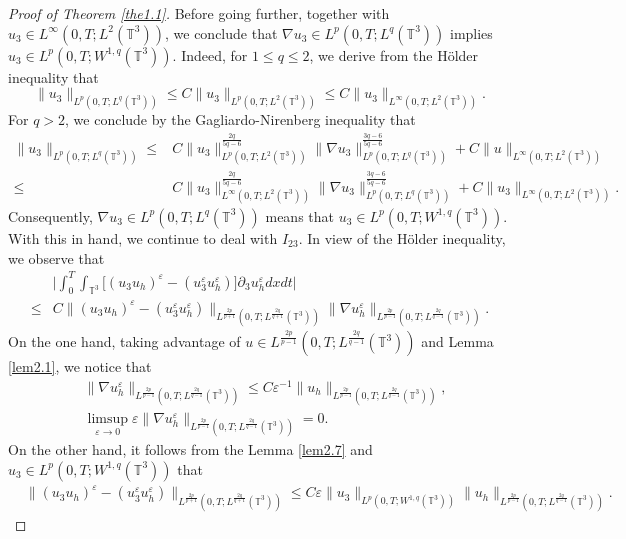 \documentclass[11pt]{article}
\theoremstyle{plain}\newtheorem{definition}{Definition}[section]
\theoremstyle{definition}\newtheorem{theorem}{Theorem}[section]
\theoremstyle{plain}\newtheorem{lemma}[theorem]{Lemma}
\theoremstyle{plain}\newtheorem{coro}[theorem]{Corollary}
\theoremstyle{plain}\newtheorem{prop}[theorem]{Proposition}
\theoremstyle{remark}\newtheorem{remark}{Remark}[section]
\newcommand{\B}{\Big}
\newcommand{\be}{\begin{equation}}
\newcommand{\ee}{\end{equation}}
\newcommand{\ba}{\begin{aligned}}
\newcommand{\ea}{\end{aligned}}
\newcommand{\f}{\frac}
\numberwithin{equation}{section}
\begin{document}
\begin{proof}[Proof of Theorem \ref{the1.1}]
Before going further, together with $ u_{3}\in L^\infty(0,T;L^2(\mathbb{T}^3))$, we conclude that $\nabla u_{3}\in L^p(0,T;L^q(\mathbb{T}^3))$ implies $  u_{3}\in L^p(0,T;W^{1,q}(\mathbb{T}^3))$. Indeed,  for $1\leq q\leq 2$, we derive from the H\"older inequality that
 	$$\| u_{3}\|_{L^p(0,T;L^q(\mathbb{T}^3))}\leq C\| u_{3}\|_{L^p(0,T;L^2(\mathbb{T}^3))}\leq C\| u_{3}\|_{L^\infty(0,T;L^2(\mathbb{T}^3))}.$$
 	For $q>2$, we conclude by the
 	Gagliardo-Nirenberg inequality that
 	 $$\ba
 \| u_{3}\|_{L^p(0,T;L^q(\mathbb{T}^3))}\leq& C\| u_{3}\|_{L^p(0,T;L^2(\mathbb{T}^3))}^{\f{2q}{5q-6}}\|\nabla u_{3}\|_{L^p(0,T;L^q(\mathbb{T}^3))}^{\f{3q-6}{5q-6}}+C\|u\|_{L^\infty(0,T;L^2(\mathbb{T}^3))}\\
 \leq &C\| u_{3}\|_{L^\infty(0,T;L^2(\mathbb{T}^3))}^{\f{2q}{5q-6}}\|\nabla u_{3}\|_{L^p(0,T;L^q(\mathbb{T}^3))}^{\f{3q-6}{5q-6}}+C\| u_{3}\|_{L^\infty(0,T;L^2(\mathbb{T}^3))}.
 \ea$$
 Consequently,
 $\nabla u_{3} \in L^{p}(0,T;L^{ q}( \mathbb{T}^{3}))$ means that
  $  u_{3} \in L^{p}(0,T;W^{1,q}( \mathbb{T}^{3})).$ With this in hand, we continue to deal with $I_{23}.$
In view of the H\"older inequality, we observe that
\be\ba\label{3.12}
&\B| \int_0^T\int_{\mathbb{T}^{3}}    \B[(u_{3} u_{h})^{\varepsilon}- (u_3^{\varepsilon}  u_{h}^{\varepsilon})\B] \partial_{3}u_{h}^{\varepsilon}dxdt\B|\\
\leq& C\|(u_{3} u_{h})^{\varepsilon}- (u_3^{\varepsilon}  u_{h}^{\varepsilon}) \|_{L^{\f{2p}{p+1}}(0,T;L^{ \f{2q}{q+1}}( \mathbb{T}^{3}))} \|\nabla u_{h}^{\varepsilon} \|_{L^{\f{2p}{p-1}}(0,T;L^{ \f{2q}{q-1}}( \mathbb{T}^{3}))}.
\ea\ee
On the one hand, taking advantage  of
  $u\in   L^{\f{2p}{p-1}}(0,T;L^{ \f{2q}{q-1}}( \mathbb{T}^{3}))$ and Lemma \ref{lem2.1}, we notice that
\be\label{3.13}\ba
& \|\nabla u_{h}^{\varepsilon} \|_{  L^{\f{2p}{p-1}}(0,T;L^{ \f{2q}{q-1}}( \mathbb{T}^{3}))}\leq C\varepsilon^{-1}\|u_{h}\|_{  L^{\f{2p}{p-1}}(0,T;L^{ \f{2q}{q-1}}( \mathbb{T}^{3}))},\\ &\limsup_{\varepsilon\rightarrow0}\varepsilon \|\nabla u_h^{\varepsilon}\|_{  L^{\f{2p}{p-1}}(0,T;L^{ \f{2q}{q-1}}( \mathbb{T}^{3}))}=0.
\ea\ee
On the other hand, it follows from the Lemma \ref{lem2.7} and $u_{3}\in L^{p}(0,T;W^{1, q}( \mathbb{T}^{3}))$ that
\begin{equation}\label{3.14} \begin{aligned}
&\|(u_{3} u_{h})^{\varepsilon}- (u_3^{\varepsilon}  u_{h}^{\varepsilon}) \|_{L^{\f{2p}{p+1}}(0,T;L^{ \f{2q}{q+1}}( \mathbb{T}^{3}))}  \leq C\varepsilon\|u_{3}\|_{L^{p}(0,T;W^{1,  q }( \mathbb{T}^{3}))}  \| u_{h}\|_{L^{\f{2p}{p-1}}(0,T;L^{ \f{2q}{q-1}}( \mathbb{T}^{3}))}.

\end{aligned}
\end{equation}
\end{proof}
\end{document}

